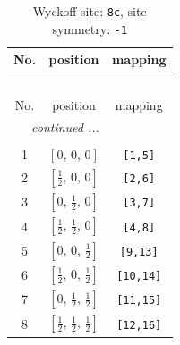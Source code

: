 \documentclass[fleqn,8pt]{jsarticle}
\begin{document}
\renewcommand{\arraystretch}{1.2}
\begin{longtable}{ccc}
\caption{Wyckoff site: {\tt 8c}, site symmetry: {\tt -1}}
 \\
 \hline \hline
No. & position & mapping \\ \hline \endfirsthead

\multicolumn{2}{l}{\tablename\ \thetable{}} \\
 \hline \hline
No. & position & mapping \\ \hline \endhead

 \hline \hline
\multicolumn{2}{r}{\footnotesize\it continued ...} \\ \endfoot

 \hline \hline
\multicolumn{2}{r}{} \\ \endlastfoot

1 & $\left[ 0,\, 0,\, 0 \right]$ & {\tt [1,5]} \\ \hline
2 & $\left[ \frac{1}{2},\, 0,\, 0 \right]$ & {\tt [2,6]} \\ \hline
3 & $\left[ 0,\, \frac{1}{2},\, 0 \right]$ & {\tt [3,7]} \\ \hline
4 & $\left[ \frac{1}{2},\, \frac{1}{2},\, 0 \right]$ & {\tt [4,8]} \\ \hline
5 & $\left[ 0,\, 0,\, \frac{1}{2} \right]$ & {\tt [9,13]} \\ \hline
6 & $\left[ \frac{1}{2},\, 0,\, \frac{1}{2} \right]$ & {\tt [10,14]} \\ \hline
7 & $\left[ 0,\, \frac{1}{2},\, \frac{1}{2} \right]$ & {\tt [11,15]} \\ \hline
8 & $\left[ \frac{1}{2},\, \frac{1}{2},\, \frac{1}{2} \right]$ & {\tt [12,16]} \\
\end{longtable}
\renewcommand{\arraystretch}{1.2}
\end{document}
